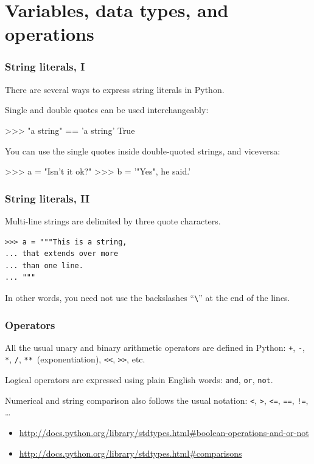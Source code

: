 \documentclass[english,serif,mathserif,xcolor=pdftex,dvipsnames,table]{beamer}
\begin{document}
\section{Variables, data types, and operations}

\begin{frame}[fragile]
  \frametitle{String literals, I}
  There are several ways to express string literals in Python.

  \+
  Single and double quotes can be used interchangeably:
\begin{semiverbatim}
>>> "a string" == 'a string'
True
\end{semiverbatim}

  \+
  You can use the single quotes inside double-quoted strings, and viceversa:
\begin{semiverbatim}
>>> a = "Isn't it ok?"
>>> b = '"Yes", he said.'
\end{semiverbatim}
\end{frame}


\begin{frame}[fragile]
  \frametitle{String literals, II}
  Multi-line strings are delimited by three quote characters.
\begin{lstlisting}[showstringspaces=false]
>>> a = """This is a string,
... that extends over more
... than one line.
... """
\end{lstlisting}

  \+ In other words, you need not use the backslashes
  ``\texttt{\textbackslash}'' at the end of the lines.
\end{frame}


\begin{frame}[fragile]
  \frametitle{Operators}
  All the usual unary and binary arithmetic operators are
  defined in Python: \texttt{+}, \texttt{-}, \texttt{*}, \texttt{/},
  \texttt{**}~(exponentiation), \texttt{<<}, \texttt{>>}, etc.

  \+
  Logical operators are expressed using plain English words:
  \texttt{and}, \texttt{or}, \texttt{not}.

  \+
  Numerical and string comparison also follows the usual notation:
  \texttt{<}, \texttt{>}, \texttt{<=}, \texttt{==}, \texttt{!=},
  \ldots

  \+
  \begin{references}
    \tiny
    \begin{itemize}
    \item
      \url{http://docs.python.org/library/stdtypes.html#boolean-operations-and-or-not}
    \item
      \url{http://docs.python.org/library/stdtypes.html#comparisons}
    \end{itemize}
  \end{references}
\end{frame}
\end{document}
